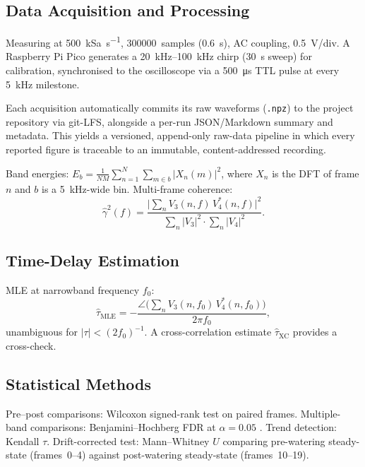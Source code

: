 \documentclass[10pt,a4paper,twocolumn]{article}
\newcommand{\gammasq}{\ensuremath{\hat{\gamma}^2}}
\newcommand{\taumle}{\ensuremath{\hat{\tau}_{\mathrm{MLE}}}}
\begin{document}
\subsection{Data Acquisition and Processing}
\label{sec:daq}

Measuring at \SI{500}{\kilo Sa\per s}, \num{300000}~samples (\SI{0.6}{\second}), AC coupling, \SI{0.5}{\volt/div}. A Raspberry Pi Pico generates a \SIrange{20}{100}{\kilo\hertz} chirp (\SI{30}{\second} sweep) for calibration, synchronised to the oscilloscope via a \SI{500}{\micro\second} TTL pulse at every \SI{5}{\kilo\hertz} milestone.

Each acquisition automatically commits its raw waveforms (\texttt{.npz}) to the project repository via \mbox{git-LFS}, alongside a per-run JSON/Markdown summary and metadata. This yields a versioned, append-only raw-data pipeline in which every reported figure is traceable to an immutable, content-addressed recording.

Band energies: $E_b = \frac{1}{NM}\sum_{n=1}^N\sum_{m\in b}|X_n(m)|^2$, where $X_n$ is the DFT of frame $n$ and $b$ is a \SI{5}{\kilo\hertz}-wide bin. Multi-frame coherence:
\begin{equation}
  \gammasq(f) = \frac{\bigl|\sum_n V_3(n,f)\,V_4^*(n,f)\bigr|^2}
                     {\sum_n|V_3|^2\cdot\sum_n|V_4|^2}.
  \label{eq:coh}
\end{equation}

\subsection{Time-Delay Estimation}

MLE at narrowband frequency $f_0$:
\begin{equation}
  \taumle = -\frac{\angle\bigl(\sum_n V_3(n,f_0)\,V_4^*(n,f_0)\bigr)}{2\pi f_0},
  \label{eq:tde}
\end{equation}
unambiguous for $|\tau|<(2f_0)^{-1}$. A cross-correlation estimate $\hat\tau_\text{XC}$ provides a cross-check.

\subsection{Statistical Methods}
\label{sec:stats}

Pre--post comparisons: Wilcoxon signed-rank test on paired frames. Multiple-band comparisons: Benjamini--Hochberg FDR at $\alpha=0.05$ \citep{Benjamini1995}. Trend detection: Kendall $\tau$. Drift-corrected test: Mann--Whitney $U$ comparing pre-watering steady-state (frames~0--4) against post-watering steady-state (frames~10--19).
\end{document}
